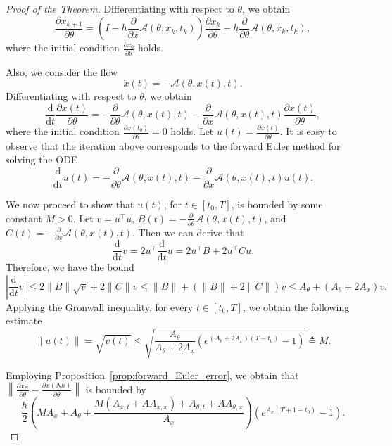 \documentclass{article}
\newcommand{\dd}{\mathrm{d}}
\begin{document}
\begin{proof}[Proof of the Theorem]
    Differentiating with respect to $\theta$, we obtain 
    \[
        \frac{\partial x_{k+1}}{\partial \theta} = 
        \left( I - h\frac{\partial}{\partial x}\mathcal{A}(\theta,x_k,t_k) \right)\frac{\partial x_k}{\partial \theta} - h\frac{\partial}{\partial \theta}\mathcal{A}(\theta,x_k,t_k),
    \]
    where the initial condition $\frac{\partial x_0}{\partial \theta}$ holds.

    Also, we consider the flow 
    \[
    \dot{x}(t) = -\mathcal{A}(\theta,x(t),t).
    \]
    Differentiating with respect to $\theta$, we obtain
    \begin{equation}\label{eq:ODE_of_partial_theta}
        \frac{\dd }{\dd t}
        \frac{\partial x(t)}{\partial \theta} = -\frac{\partial}{\partial \theta}\mathcal{A}(\theta,x(t),t) - 
        \frac{\partial}{\partial x}\mathcal{A}(\theta,x(t),t)\frac{\partial x(t)}{\partial \theta}, 
    \end{equation}
    where the initial condition $\frac{\partial x(t_0)}{\partial \theta} = 0$ holds. 
    Let $u(t) = \frac{\partial x(t)}{\partial \theta}$. It is easy to observe that the iteration above corresponds to the forward Euler method for solving the ODE
    \[
    \frac{\dd}{\dd t}u(t) = 
    -\frac{\partial}{\partial \theta}\mathcal{A}(\theta,x(t),t) - 
        \frac{\partial}{\partial x}\mathcal{A}(\theta,x(t),t)u(t).  
    \]

    We now proceed to show that $u(t)$, for $t \in [t_0,T]$, is bounded by some constant $M > 0$. Let $v = u^\top u$, $B(t) = -\frac{\partial}{\partial \theta}\mathcal{A}(\theta,x(t),t)$, and $C(t) = -\frac{\partial}{\partial x}\mathcal{A}(\theta,x(t),t)$. Then we can derive that
    \[
        \frac{\dd}{\dd t}v = 2u^\top \frac{\dd}{\dd t}u = 2u^\top B + 2u^\top C u.
    \]
    Therefore, we have the bound
    \[
        \left|\frac{\dd}{\dd t}v\right| \leq 2\|B\|\sqrt{v} + 2\|C\|v \leq \|B\| + (\|B\| + 2\|C\|)v \leq A_{\theta} + (A_{\theta} + 2A_x)v.
    \]
    Applying the Gronwall inequality,  for every $t \in [t_0,T]$, we obtain the following estimate 
    \begin{equation}\label{eq:err_u}
        \|u(t)\| = \sqrt{v(t)} \leq \sqrt{\frac{A_{\theta}}{A_{\theta} + 2A_x} \left(e^{(A_{\theta} + 2A_x)(T - t_0)} - 1\right)} \triangleq M.
    \end{equation}

    Employing Proposition~\ref{prop:forward_Euler_error}, we obtain that $\left\|\frac{\partial x_N}{\partial \theta} - \frac{\partial x(Nh)}{\partial \theta}\right\|$ is bounded by 
    \[
        \frac{h}{2}
        \left(
        MA_x+A_{\theta}+
        \frac{M(A_{x,t}+AA_{x,x})+A_{\theta,t}+AA_{\theta,x}}{A_x}
        \right)
        \left(e^{A_x(T+1-t_0)} - 1\right).
    \]


\end{proof}
\end{document}
